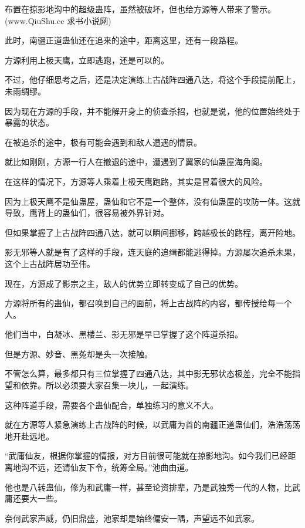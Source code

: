 
\begin{this_body}

布置在掠影地沟中的超级蛊阵，虽然被破坏，但也给方源等人带来了警示。(www.QiuShu.cc 求书小说网)

此时，南疆正道蛊仙还在追来的途中，距离这里，还有一段路程。

方源利用上极天鹰，立即逃跑，还是可以的。

不过，他仔细思考之后，还是决定演练上古战阵四通八达，将这个手段提前配上，未雨绸缪。

因为现在方源的手段，并不能解开身上的侦查杀招，也就是说，他的位置始终处于暴露的状态。

在被追杀的途中，极有可能会遇到和敌人遭遇的情景。

就比如刚刚，方源一行人在撤退的途中，遭遇到了翼家的仙蛊屋海角阁。

在这样的情况下，方源等人乘着上极天鹰跑路，其实是冒着很大的风险。

因为上极天鹰不是仙蛊屋，蛊仙和它不是一个整体，没有仙蛊屋的攻防一体。这就导致，鹰背上的蛊仙们，很容易被外界针对。

但如果掌握了上古战阵四通八达，就可以瞬间挪移，跨越极长的路程，离开险地。

影无邪等人就是有了这样的手段，连天庭的追缉都能逃得掉。方源屡次追杀未果，这个上古战阵居功至伟。

现在，方源成了影宗之主，敌人的优势立即转变成了自己的优势。

方源将所有的蛊仙，都召唤到自己的面前，将上古战阵的内容，都传授给每一个人。

他们当中，白凝冰、黑楼兰、影无邪是早已掌握了这个阵道杀招。

但是方源、妙音、黑菟却是头一次接触。

不管怎么算，最多都只有三位掌握了四通八达，其中影无邪状态极差，完全不能指望和依靠。所以必须要大家召集一块儿，一起演练。

这种阵道手段，需要各个蛊仙配合，单独练习的意义不大。

就在方源等人紧急演练上古战阵的时候，以武庸为首的南疆正道蛊仙们，浩浩荡荡地开赴远地。

“武庸仙友，根据你掌握的情报，对方目前很可能就在掠影地沟。如今我们已经距离地沟不远，还请仙友下令，统筹全局。”池曲由道。

他也是八转蛊仙，修为和武庸一样，甚至论资排辈，乃是武独秀一代的人物，比武庸还要大一些。

奈何武家声威，仍旧鼎盛，池家却是始终偏安一隅，声望远不如武家。


\end{this_body}
